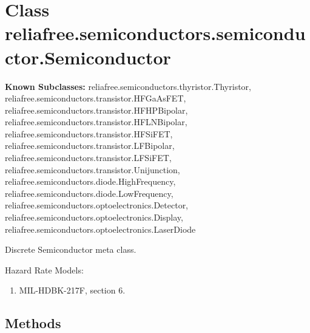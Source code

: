 %
%
%


\section{Class reliafree.semiconductors.semiconductor.Semiconductor}

    \label{reliafree:semiconductors:semiconductor:Semiconductor}
\textbf{Known Subclasses:}
reliafree.semiconductors.thyristor.Thyristor,
    reliafree.semiconductors.transistor.HFGaAsFET,
    reliafree.semiconductors.transistor.HFHPBipolar,
    reliafree.semiconductors.transistor.HFLNBipolar,
    reliafree.semiconductors.transistor.HFSiFET,
    reliafree.semiconductors.transistor.LFBipolar,
    reliafree.semiconductors.transistor.LFSiFET,
    reliafree.semiconductors.transistor.Unijunction,
    reliafree.semiconductors.diode.HighFrequency,
    reliafree.semiconductors.diode.LowFrequency,
    reliafree.semiconductors.optoelectronics.Detector,
    reliafree.semiconductors.optoelectronics.Display,
    reliafree.semiconductors.optoelectronics.LaserDiode

Discrete Semiconductor meta class.

Hazard Rate Models:

\begin{enumerate}

\setlength{\parskip}{0.5ex}
  \item MIL-HDBK-217F, section 6.

\end{enumerate}



  \subsection{Methods}

